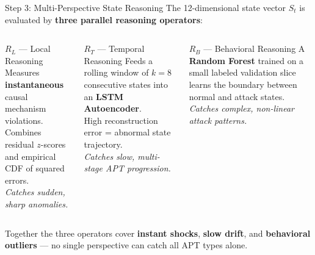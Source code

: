 \documentclass[aspectratio=169]{beamer}
\begin{document}
\begin{frame}{Step 3: Multi-Perspective State Reasoning}
  \small
  The 12-dimensional state vector $S_t$ is evaluated by \textbf{three parallel reasoning operators}:

  \vspace{0.4em}
  \begin{columns}[t]
      \begin{block}{$R_L$ — Local Reasoning}
        Measures \textbf{instantaneous} causal mechanism violations.\\[0.3em]
        Combines residual $z$-scores and empirical CDF of squared errors.\\[0.3em]
        \textit{Catches sudden, sharp anomalies.}
      \end{block}

      \begin{block}{$R_T$ — Temporal Reasoning}
        Feeds a rolling window of $k{=}8$ consecutive states into an \textbf{LSTM Autoencoder}.\\[0.3em]
        High reconstruction error = abnormal state trajectory.\\[0.3em]
        \textit{Catches slow, multi-stage APT progression.}
      \end{block}

      \begin{block}{$R_B$ — Behavioral Reasoning}
        A \textbf{Random Forest} trained on a small labeled validation slice learns the boundary between normal and attack states.\\[0.3em]
        \textit{Catches complex, non-linear attack patterns.}
      \end{block}
  \end{columns}

  \vspace{0.4em}
  Together the three operators cover \textbf{instant shocks}, \textbf{slow drift}, and \textbf{behavioral outliers} --- no single perspective can catch all APT types alone.
\end{frame}
\end{document}
